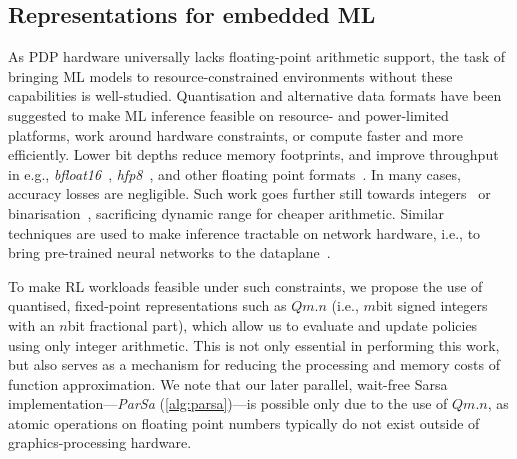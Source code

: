 \documentclass[
sigconf,natbib=false
,anonymous=true
,10pt
]{acmart}
\newcounter{insightc}
\newenvironment{insight}
	{
		\begin{tipblock}\refstepcounter{insightc}\textbf{Insight \theinsightc:}\em
	}
	{
		\end{tipblock}
	}
\begin{document}

\subsection{Representations for embedded ML}
As PDP hardware universally lacks floating-point arithmetic support, the task of bringing ML models to resource-constrained environments without these capabilities is well-studied.
Quantisation and alternative data formats have been suggested to make ML inference feasible on resource- and power-limited platforms, work around hardware constraints, or compute faster and more efficiently.
Lower bit depths reduce memory footprints, and improve throughput in e.g., \emph{bfloat16}~\parencite{bfloat16-blog,DBLP:journals/sigops/XieDMKVZT18}, \emph{hfp8}~\parencite{DBLP:conf/nips/SunCCWVSCZG19}, and other floating point formats~\parencite{DBLP:journals/corr/abs-2007-01530}.
In many cases, accuracy losses are negligible.
Such work goes further still towards integers~\parencite{tensorrt-8bit} or binarisation~\parencite{DBLP:journals/corr/MiyashitaLM16,DBLP:conf/eccv/RastegariORF16,DBLP:journals/corr/KimS16,DBLP:conf/nips/HubaraCSEB16}, sacrificing dynamic range for cheaper arithmetic.
Similar techniques are used to make inference tractable on network hardware, i.e., to bring pre-trained neural networks to the dataplane~\parencite{DBLP:journals/corr/abs-2009-02353,DBLP:conf/sigcomm/SanvitoSB18,DBLP:journals/corr/abs-1801-05731}.

To make RL workloads feasible under such constraints, we propose the use of quantised, fixed-point representations such as $Qm.n$ (i.e., $m$\si{bit} signed integers with an $n$\si{bit} fractional part), which allow us to evaluate and update policies using only integer arithmetic.
This is not only essential in performing this work, but also serves as a mechanism for reducing the processing and memory costs of function approximation.
We note that our later parallel, wait-free Sarsa implementation---\emph{ParSa} (\cref{alg:parsa})---is possible only due to the use of $Qm.n$, as atomic operations on floating point numbers typically do not exist outside of graphics-processing hardware.

\end{document}

